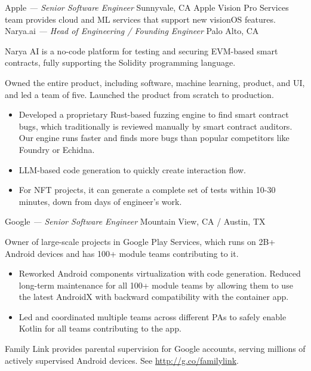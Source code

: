 \documentclass[]{friggeri-cv}
\begin{document}
\begin{entrylist}
  {Apple \emph{--- Senior Software Engineer}}
  {Sunnyvale, CA}
  {
    Apple Vision Pro Services team provides cloud and ML services that support new visionOS features.
  }
  {Narya.ai \emph{--- Head of Engineering / Founding Engineer}}
  {Palo Alto, CA}
  {
    Narya AI is a no-code platform for testing and securing EVM-based smart contracts,
    fully supporting the Solidity programming language.

    Owned the entire product, including software, machine learning, product, and UI, and led a team of five.
    Launched the product from scratch to production.

    \begin{itemize}
      \item Developed a proprietary Rust-based fuzzing engine to find smart contract bugs,
      which traditionally is reviewed manually by smart contract auditors.
      Our engine runs faster and finds more bugs than popular competitors like Foundry or Echidna.
      \item LLM-based code generation to quickly create interaction flow.
      \item For NFT projects, it can generate a complete set of tests within 10-30 minutes,
      down from days of engineer's work.
    \end{itemize}
  }
  {Google \emph{--- Senior Software Engineer}}
  {Mountain View, CA / Austin, TX}
  {
    Owner of large-scale projects in Google Play Services,
    which runs on 2B+ Android devices and has 100+ module teams contributing to it.

    \begin{itemize}
      \item Reworked Android components virtualization with code generation.
      Reduced long-term maintenance for all 100+ module teams by allowing them to
      use the latest AndroidX with backward compatibility with the container app.
      \item Led and coordinated multiple teams across different PAs to
      safely enable Kotlin for all teams contributing to the app.
    \end{itemize}

    Family Link provides parental supervision for Google accounts,
    serving millions of actively supervised Android devices.
    See \url{http://g.co/familylink}.

}
\end{entrylist}
\end{document}
